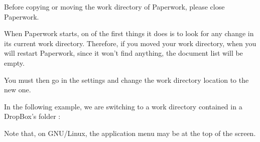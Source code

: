 \documentclass[10pt,a4paper]{article}
\begin{document}
Before copying or moving the work directory of Paperwork, please close
Paperwork.

When Paperwork starts, on of the first things it does is to look for
any change in its current work directory. Therefore, if you moved
your work directory, when you will restart Paperwork, since it won't
find anything, the document list will be empty.

You must then go in the settings and change the work directory location
to the new one.

In the following example, we are switching to a work directory contained
in a DropBox's folder :

%
Note that, on GNU/Linux, the application menu may be at the top of
the screen.



\end{document}
